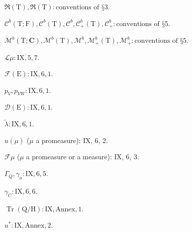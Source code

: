 \(\Re(\mathrm{T}), \Re(\mathrm{T}): \text{conventions of §3}\).

\(\mathcal{C}^b(\mathrm{T}; \mathrm{F}), \mathcal{C}^b(\mathrm{T}), \mathcal{C}^b, \mathcal{C}_+^b(\mathrm{T}), \mathcal{C}_+^b: \text{conventions of §5}\).

\(\mathcal{M}^b(\mathrm{T}; \mathbf{C}), \mathcal{M}^b(\mathrm{T}), \mathcal{M}^b, \mathcal{M}_+^b(\mathrm{T}), \mathcal{M}_+^b: \text{conventions of §5}\).

\(\mathcal{L}\mu: \mathrm{IX}, 5, 7\).

\(\mathcal{F}(\mathrm{E}): \mathrm{IX}, 6, 1\).

\(p_V, p_{VW}: \mathrm{IX}, 6, 1\).

\(\mathcal{D}(\mathrm{E}): \mathrm{IX}, 6, 1\).

\(\widetilde{\lambda}: \mathrm{IX}, 6, 1\).

\(u(\mu)\) (\(\mu\) a promeasure): IX, 6, 2.

\(\mathcal{F}\mu\) (\(\mu\) a promeasure or a measure): IX, 6, 3.

\(\Gamma_Q, \gamma_a: \mathrm{IX}, 6, 5\).

\(\gamma_C: \mathrm{IX}, 6, 6\).

\(\operatorname{Tr}(\mathrm{Q}/\mathrm{H}): \mathrm{IX}, \text{Annex}, 1\).

\(u^*: \mathrm{IX}, \text{Annex}, 2\).
\relax{}
